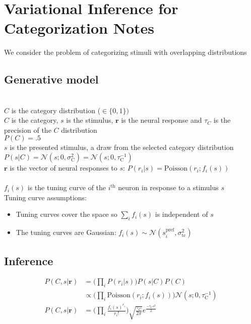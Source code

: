 \documentclass[12pt]{article}
\begin{document}
\section*{Variational Inference for Categorization Notes}
We consider the problem of categorizing stimuli with overlapping distributions
\subsection{Generative model}
 \\
$C$ is the category distribution ($\in \{0, 1\})$\\
$C$ is the category, $s$ is the stimulus, $\mathbf{r}$ is the neural response and $\tau_C$ is the precision of the $C$ distribution\\
$P(C) = .5$\\ 
$s$ is the presented stimulus, a draw from the selected category distribution\\
$P(s|C) = \mathcal{N} (s; 0, \sigma_{\text{C}}^2) = \mathcal{N} (s; 0, \tau_{\text{C}}^{-1})$\\
$\mathbf{r}$ is the vector of neural responses to $s$:
$P(r_i|s) = \text{Poisson}(r_i; f_i(s))$\\
~\\
$f_i(s)$ is the tuning curve of the $i^\text{th}$ neuron in response to a stimulus $s$\\
Tuning curve assumptions:
\begin{itemize}
\item Tuning curves cover the space so $\sum_i f_i(s)$ is independent of $s$
\item The tuning curves are Gaussian: $f_i(s) \sim \mathcal{N} (s_i^{\text{pref}}, \sigma_{\text{tc}}^2)$
\end{itemize}

\subsection{Inference}
\begin{equation}
\begin{aligned}
P(C, s|\mathbf{r}) &= \Big(\prod_i P(r_i|s)\Big) P(s|C) P(C)\\
&\propto \Big(\prod_i \text{Poisson}(r_i; f_i(s))\Big) \mathcal{N} (s; 0, \tau_{\text{C}}^{-1})\\
P(C, s|\mathbf{r}) &= \Big(\prod_i \frac{f_i(s)^{r_i}}{r_i!} \Big) \sqrt{\frac{\tau_C}{2 \pi}} e^{\frac{-\tau_C s^2}{2}}
\end{aligned}
\end{equation}
\end{document}
